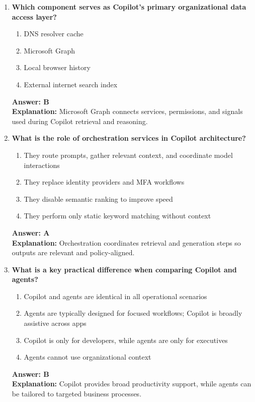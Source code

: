 \documentclass[10pt]{article}
\begin{document}
\begin{enumerate}[leftmargin=*]
\item \textbf{Which component serves as Copilot’s primary organizational data access layer?}
\begin{enumerate}[label=\Alph*.]
  \item DNS resolver cache
  \item Microsoft Graph
  \item Local browser history
  \item External internet search index
\end{enumerate}
\textbf{Answer: B}\\
\textbf{Explanation:} Microsoft Graph connects services, permissions, and signals used during Copilot retrieval and reasoning.

\item \textbf{What is the role of orchestration services in Copilot architecture?}
\begin{enumerate}[label=\Alph*.]
  \item They route prompts, gather relevant context, and coordinate model interactions
  \item They replace identity providers and MFA workflows
  \item They disable semantic ranking to improve speed
  \item They perform only static keyword matching without context
\end{enumerate}
\textbf{Answer: A}\\
\textbf{Explanation:} Orchestration coordinates retrieval and generation steps so outputs are relevant and policy-aligned.

\item \textbf{What is a key practical difference when comparing Copilot and agents?}
\begin{enumerate}[label=\Alph*.]
  \item Copilot and agents are identical in all operational scenarios
  \item Agents are typically designed for focused workflows; Copilot is broadly assistive across apps
  \item Copilot is only for developers, while agents are only for executives
  \item Agents cannot use organizational context
\end{enumerate}
\textbf{Answer: B}\\
\textbf{Explanation:} Copilot provides broad productivity support, while agents can be tailored to targeted business processes.


\end{enumerate}
\end{document}
